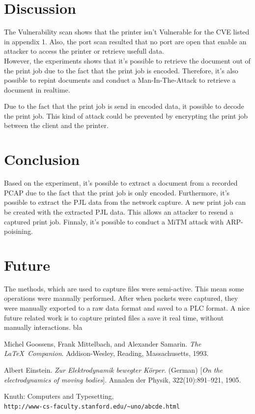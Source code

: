 \documentclass[a4paper]{article}
\begin{document}
\section{Discussion} %
\label{Discussion}
The Vulnerability scan shows that the printer isn't Vulnerable for the CVE listed in appendix 1. Also, the port scan resulted that no port are open that enable an attacker to access the printer or retrieve usefull data. 
\\
However, the experiments shows that it's possible to retrieve the document out of the print job due to the fact that the print job is encoded. Therefore, it's also possible to repint documents and conduct a Man-In-The-Attack to retrieve a document in realtime.

Due to the fact that the print job is send in encoded data, it possible to decode the print job. This kind of attack could be prevented by encrypting the print job between the client and the printer.

\section{Conclusion} %
Based on the experiment, it's possible to extract a document from a recorded PCAP due to the fact that the print job is only encoded. Furthermore,  it's possible to extract the PJL data from the network capture. A new print job can be created with the extracted PJL data. This allows an attacker to resend a captured print job. Finnaly, it's possible to conduct a MiTM attack with ARP-poisining.


\section{Future}
The methods, which are used to capture files were semi-active. This mean some operations were manually performed. After when packets were captured, they were manually exported to a raw data format and saved to a PLC format. A nice future related work is to capture printed files a save it real time, without manually interactions. bla\cite{latexcompanion} 

\begin{thebibliography}{9}
Michel Goossens, Frank Mittelbach, and Alexander Samarin. 
\textit{The \LaTeX\ Companion}. 
Addison-Wesley, Reading, Massachusetts, 1993.
 
Albert Einstein. 
\textit{Zur Elektrodynamik bewegter K{\"o}rper}. (German) 
[\textit{On the electrodynamics of moving bodies}]. 
Annalen der Physik, 322(10):891–921, 1905.
 
Knuth: Computers and Typesetting,
\\\texttt{http://www-cs-faculty.stanford.edu/\~{}uno/abcde.html}
\end{thebibliography}


	
	
	
	
\end{document}

